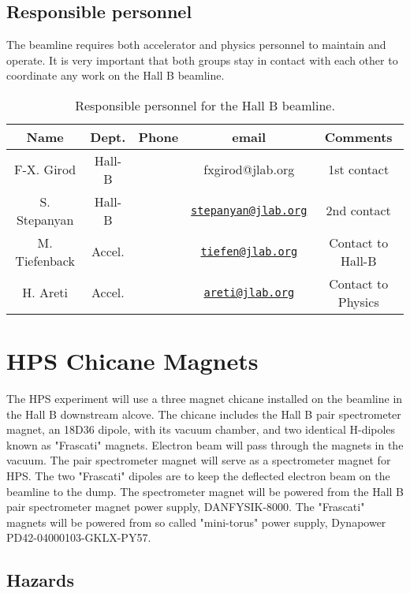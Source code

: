 \documentclass[11pt]{report}
\begin{document}
\subsection{Responsible personnel}

The beamline requires both accelerator and physics personnel to maintain and operate. It is very important that both groups stay in contact with each other to coordinate any work on the Hall B beamline.  

 \begin{table}[!ht]
 \centering
 \begin{tabular}{|c|c|c|c|c|}
\hline
 Name&Dept.&Phone&email&Comments \\ \hline
 F-X. Girod & Hall-B&&fxgirod@jlab.org& 1st contact  \\ \hline
S. Stepanyan & Hall-B&&\href{mailto:stepanyan@jlab.org}{\nolinkurl{stepanyan@jlab.org}}&2nd contact \\ \hline
  M. Tiefenback &Accel.&&\href{mailto:tiefen@jlab.org}{\nolinkurl{tiefen@jlab.org}}& Contact to Hall-B \\ \hline
 H. Areti& Accel.&&\href{mailto:areti@jlab.org}{\nolinkurl{areti@jlab.org}}&Contact to Physics \\ \hline
\end{tabular}
\caption{Responsible personnel for the Hall B beamline.} 
\label{tb:beam}
\end{table}


\section{HPS Chicane Magnets}
\indent

The HPS experiment will use a three magnet chicane installed on the beamline in the Hall B downstream alcove. The chicane includes the Hall B pair spectrometer magnet, an 18D36 dipole, with its vacuum chamber, and two identical H-dipoles known as "Frascati" magnets. Electron beam will pass through the magnets in the vacuum. The pair spectrometer magnet will serve as a spectrometer magnet for HPS. The two "Frascati" dipoles are to keep the deflected electron beam on the beamline to the dump. The spectrometer magnet will be powered from the Hall B pair spectrometer magnet power supply, DANFYSIK-8000. The "Frascati" magnets will be powered from so called "mini-torus" power supply, Dynapower PD42-04000103-GKLX-PY57.   
 
\subsection{Hazards} 
\indent
\end{document}
